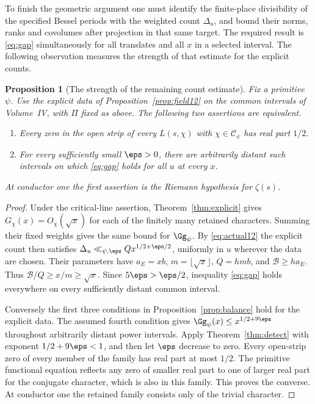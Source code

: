 \documentclass[a4paper,11pt]{article}
\newtheorem{proposition}{Proposition}[section]
\theoremstyle{definition}
\theoremstyle{remark}
\numberwithin{equation}{section}
\begin{document}
To finish the geometric argument one must identify the finite-place divisibility of the specified Bessel periods with the weighted count \(\Delta_u\), and bound their norms, ranks and covolumes after projection in that same target. The required result is \eqref{eq:gap} simultaneously for all translates and all \(x\) in a selected interval. The following observation measures the strength of that estimate for the explicit counts.

\begin{proposition}[The strength of the remaining count estimate]\leavevmode\label{prop:strength26}
Fix a primitive \(\psi\). Use the explicit data of Proposition~\ref{prop:field12} on the common intervals of Volume~IV, with \(\Pi\) fixed as above. The following two assertions are equivalent.
\begin{enumerate}
\item Every zero in the open strip of every \(L(s,\chi)\) with \(\chi\in\mathcal C_\psi\) has real part \(1/2\).
\item For every sufficiently small \(\eps>0\), there are arbitrarily distant such intervals on which \eqref{eq:gap} holds for all \(u\) at every \(x\).
\end{enumerate}
At conductor one the first assertion is the Riemann hypothesis for \(\zeta(s)\).
\end{proposition}
\begin{proof}
Under the critical-line assertion, Theorem~\ref{thm:explicit} gives \(G_\chi(x)=O_\chi(\sqrt{x})\) for each of the finitely many retained characters. Summing their fixed weights gives the same bound for \(\Gg_\psi\). By \eqref{eq:actual12} the explicit count then satisfies \(\Delta_u\ll_{\psi,\eps} Q x^{1/2+\eps/2}\), uniformly in \(u\) wherever the data are chosen. Their parameters have \(a_E=xb\), \(m=\lfloor\sqrt{x}\rfloor\), \(Q=hmb\), and \(\mathcal B\ge h a_E\). Thus \(\mathcal B/Q\ge x/m\ge\sqrt{x}\). Since \(5\eps>\eps/2\), inequality \eqref{eq:gap} holds everywhere on every sufficiently distant common interval.

Conversely the first three conditions in Proposition~\ref{prop:balance} hold for the explicit data. The assumed fourth condition gives \(\Gg_\psi(x)\le x^{1/2+9\eps}\) throughout arbitrarily distant power intervals. Apply Theorem~\ref{thm:detect} with exponent \(1/2+9\eps<1\), and then let \(\eps\) decrease to zero. Every open-strip zero of every member of the family has real part at most \(1/2\). The primitive functional equation reflects any zero of smaller real part to one of larger real part for the conjugate character, which is also in this family. This proves the converse. At conductor one the retained family consists only of the trivial character.
\end{proof}
\end{document}
